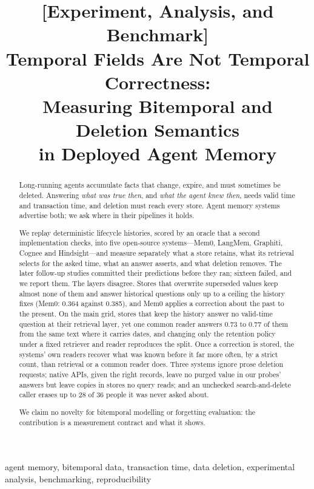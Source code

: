 \documentclass[conference]{IEEEtran}
\title{[Experiment, Analysis, and Benchmark]\\
Temporal Fields Are Not Temporal Correctness:\\
Measuring Bitemporal and Deletion Semantics\\ in Deployed Agent Memory}
\author{\IEEEauthorblockN{Suan Lee}
\IEEEauthorblockA{School of Computer Science\\
Semyung University\\
Jecheon, South Korea\\
suanlee@semyung.ac.kr}}
\begin{document}
\maketitle

\begin{abstract}
Long-running agents accumulate facts that change, expire, and must sometimes be
deleted. Answering \emph{what was true then}, and \emph{what the agent knew then},
needs valid time and transaction time, and deletion must reach every store.
Agent memory systems advertise both; we ask where in their pipelines it holds.

We replay deterministic lifecycle histories, scored by an oracle that a second
implementation checks, into five open-source systems---Mem0, LangMem, Graphiti,
Cognee and Hindsight---and measure separately what a store retains, what its
retrieval selects for the asked time, what an answer asserts, and what deletion
removes. The later follow-up studies committed their predictions before they
ran; sixteen failed, and we report them. The layers disagree. Stores that
overwrite superseded values keep almost none of them and answer historical
questions only up to a ceiling the history fixes (Mem0: 0.364 against 0.385),
and Mem0 applies a correction about the past to the present. On the main grid, stores that keep
the history answer no valid-time question at their retrieval layer, yet one
common reader answers 0.73 to 0.77 of them from the same text where it carries
dates, and changing only the retention policy under a fixed retriever and
reader reproduces the split. Once a correction is stored, the systems' own
readers recover what was known before it far more often, by a strict count,
than retrieval or a common reader does. Three systems ignore prose deletion requests; native APIs, given the
right records, leave no purged value in our probes' answers but leave copies in
stores no query reads; and an unchecked search-and-delete caller erases up to
28 of 36 people it was never asked about.

We claim no novelty for bitemporal modelling or forgetting evaluation: the
contribution is a measurement contract and what it shows.
\end{abstract}

\begin{IEEEkeywords}
agent memory, bitemporal data, transaction time, data deletion,
experimental analysis, benchmarking, reproducibility
\end{IEEEkeywords}
\end{document}
